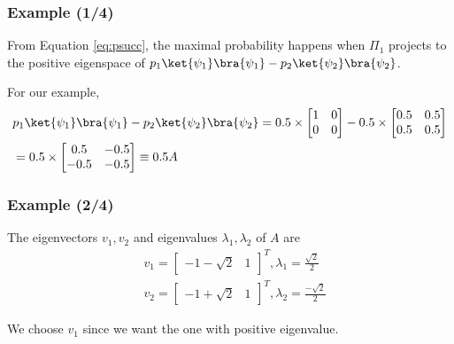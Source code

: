 \documentclass{beamer}
\begin{document}
\begin{frame}
    \label{frame:med_math}
    \frametitle{Example (1/4)}
    From Equation \ref{eq:psucc}, the maximal probability happens when $\Pi_{1}$
    projects to the positive eigenspace of
    $p_{1} \ket{\psi_{1}}\bra{\psi_{1}} - p_{2} \ket{\psi_{2}}\bra{\psi_{2}}$.

    For our example,
    \begin{align*}
         & p_{1} \ket{\psi_{1}}\bra{\psi_{1}} - p_{2} \ket{\psi_{2}}\bra{\psi_{2}}
        = 0.5 \times \begin{bmatrix}
                         1 & 0 \\ 0 & 0
                     \end{bmatrix}
        - 0.5 \times \begin{bmatrix}
                         0.5 & 0.5 \\ 0.5 & 0.5
                     \end{bmatrix}                                         \\
         & = 0.5 \times \begin{bmatrix}
                            0.5 & -0.5 \\ -0.5 & -0.5
                        \end{bmatrix}
        \equiv 0.5 A
    \end{align*}
\end{frame}

\begin{frame}
    \frametitle{Example (2/4)}
    The eigenvectors $v_{1}, v_{2}$ and eigenvalues $\lambda_{1}, \lambda_{2}$ of $A$ are
    \begin{align}
         & v_{1} = \begin{bmatrix} -1 - \sqrt{2} & 1   \end{bmatrix} ^{T},
        \lambda_{1} =\frac{\sqrt{2}}{2}                                     \\
         & v_{2} = \begin{bmatrix}  -1 + \sqrt{2} & 1   \end{bmatrix} ^{T},
        \lambda_{2} =\frac{-\sqrt{2}}{2}
    \end{align}

    We choose $v_{1}$ since we want the one with positive eigenvalue.
\end{frame}
\end{document}
